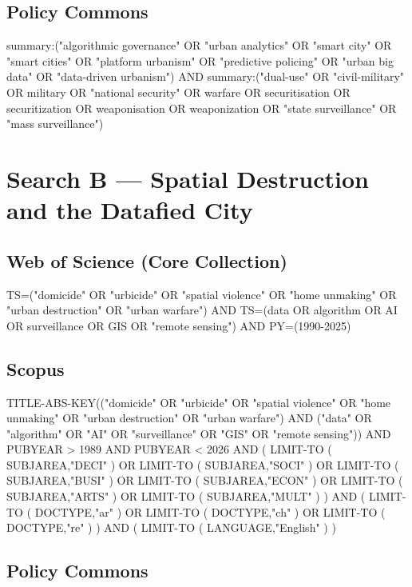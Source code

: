 \subsection{Policy Commons}

{\small\ttfamily\raggedright summary:("algorithmic governance" OR "urban analytics" OR "smart city" OR "smart cities" OR "platform urbanism" OR "predictive policing" OR "urban big data" OR "data-driven urbanism") AND summary:("dual-use" OR "civil-military" OR military OR "national security" OR warfare OR securitisation OR securitization OR weaponisation OR weaponization OR "state surveillance" OR "mass surveillance")\par}

\section{Search B --- Spatial Destruction and the Datafied City}

\subsection{Web of Science (Core Collection)}

{\small\ttfamily\raggedright TS=("domicide" OR "urbicide" OR "spatial violence" OR "home unmaking" OR "urban destruction" OR "urban warfare") AND TS=(data OR algorithm OR AI OR surveillance OR GIS OR "remote sensing") AND PY=(1990-2025)\par}

\subsection{Scopus}

{\small\ttfamily\raggedright TITLE-ABS-KEY(("domicide" OR "urbicide" OR "spatial violence" OR "home unmaking" OR "urban destruction" OR "urban warfare") AND ("data" OR "algorithm" OR "AI" OR "surveillance" OR "GIS" OR "remote sensing")) AND PUBYEAR > 1989 AND PUBYEAR < 2026 AND ( LIMIT-TO ( SUBJAREA,"DECI" ) OR LIMIT-TO ( SUBJAREA,"SOCI" ) OR LIMIT-TO ( SUBJAREA,"BUSI" ) OR LIMIT-TO ( SUBJAREA,"ECON" ) OR LIMIT-TO ( SUBJAREA,"ARTS" ) OR LIMIT-TO ( SUBJAREA,"MULT" ) ) AND ( LIMIT-TO ( DOCTYPE,"ar" ) OR LIMIT-TO ( DOCTYPE,"ch" ) OR LIMIT-TO ( DOCTYPE,"re" ) ) AND ( LIMIT-TO ( LANGUAGE,"English" ) )\par}

\subsection{Policy Commons}

